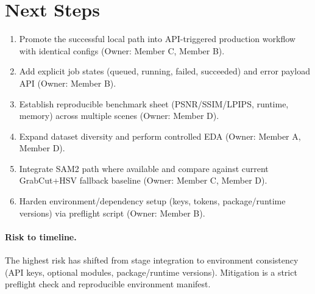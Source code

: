 \documentclass[10pt,twocolumn,letterpaper]{article}
\newif\ifcvprtemplate
\begin{document}
\section{Next Steps}
\begin{enumerate}[leftmargin=*]
    \item Promote the successful local path into API-triggered production workflow with identical configs (Owner: Member C, Member B).
    \item Add explicit job states (queued, running, failed, succeeded) and error payload API (Owner: Member B).
    \item Establish reproducible benchmark sheet (PSNR/SSIM/LPIPS, runtime, memory) across multiple scenes (Owner: Member D).
    \item Expand dataset diversity and perform controlled EDA (Owner: Member A, Member D).
    \item Integrate SAM2 path where available and compare against current GrabCut+HSV fallback baseline (Owner: Member C, Member D).
    \item Harden environment/dependency setup (keys, tokens, package/runtime versions) via preflight script (Owner: Member B).
\end{enumerate}

\paragraph{Risk to timeline.}
The highest risk has shifted from stage integration to environment consistency (API keys, optional modules, package/runtime versions). Mitigation is a strict preflight check and reproducible environment manifest.

{\small
\ifcvprtemplate

\else

\fi

}
\end{document}
